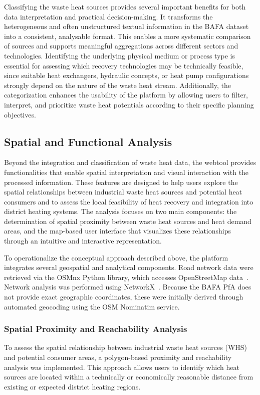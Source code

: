 \documentclass[letterpaper,11pt]{article}
\begin{document}
Classifying the waste heat sources provides several important benefits for both data interpretation and practical decision-making. It transforms the heterogeneous and often unstructured textual information in the BAFA dataset into a consistent, analysable format. This enables a more systematic comparison of sources and supports meaningful aggregations across different sectors and technologies. Identifying the underlying physical medium or process type is essential for assessing which recovery technologies may be technically feasible, since suitable heat exchangers, hydraulic concepts, or heat pump configurations strongly depend on the nature of the waste heat stream. Additionally, the categorization enhances the usability of the platform by allowing users to filter, interpret, and prioritize waste heat potentials according to their specific planning objectives.

\subsection{Spatial and Functional Analysis}
Beyond the integration and classification of waste heat data, the webtool provides functionalities that enable spatial interpretation and visual interaction with the processed information. 
These features are designed to help users explore the spatial relationships between industrial waste heat sources and potential heat consumers and to assess the local feasibility of heat recovery and integration into district heating systems. 
The analysis focuses on two main components: the determination of spatial proximity between waste heat sources and heat demand areas, and the map-based user interface that visualizes these relationships through an intuitive and interactive representation.

To operationalize the conceptual approach described above, the platform integrates several geospatial and analytical components. Road network data were retrieved via the OSMnx Python library, which accesses OpenStreetMap data~\cite{Boeing.2017, OSM}. Network analysis was performed using NetworkX~\cite{Hagberg.2008}. Because the BAFA PfA does not provide exact geographic coordinates, these were initially derived through automated geocoding using the OSM Nominatim service.

\subsubsection{Spatial Proximity and Reachability Analysis}
To assess the spatial relationship between industrial waste heat sources (WHS) and potential consumer areas, a polygon-based proximity and reachability analysis was implemented. 
This approach allows users to identify which heat sources are located within a technically or economically reasonable distance from existing or expected district heating regions.
\end{document}
